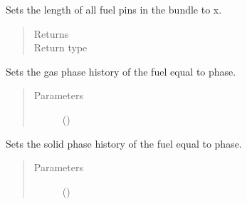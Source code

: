\documentclass[letterpaper,10pt,openany,oneside,english]{sphinxmanual}
\begin{document}
\begin{fulllineitems}
\begin{fulllineitems}
\label{\detokenize{support_rst/fuel_bundle:fuel_bundle.FuelBundle.set_fuel_pin_length}}
Sets the length of all fuel pins in the bundle to x.
\begin{quote}\begin{description}
\item[{Returns}] \leavevmode
{}

\item[{Return type}] \leavevmode
{}

\end{description}\end{quote}

\end{fulllineitems}


\begin{fulllineitems}
\label{\detokenize{support_rst/fuel_bundle:fuel_bundle.FuelBundle.set_gas_phase}}
Sets the gas phase history of the fuel equal to phase.
\begin{quote}\begin{description}
\item[{Parameters}] \leavevmode
{} () \textendash{} 

\end{description}\end{quote}

\end{fulllineitems}


\begin{fulllineitems}
\label{\detokenize{support_rst/fuel_bundle:fuel_bundle.FuelBundle.set_solid_phase}}
Sets the solid phase history of the fuel equal to phase.
\begin{quote}\begin{description}
\item[{Parameters}] \leavevmode
{} () \textendash{} 


\end{description}
\end{quote}
\end{fulllineitems}
\end{fulllineitems}
\end{document}
